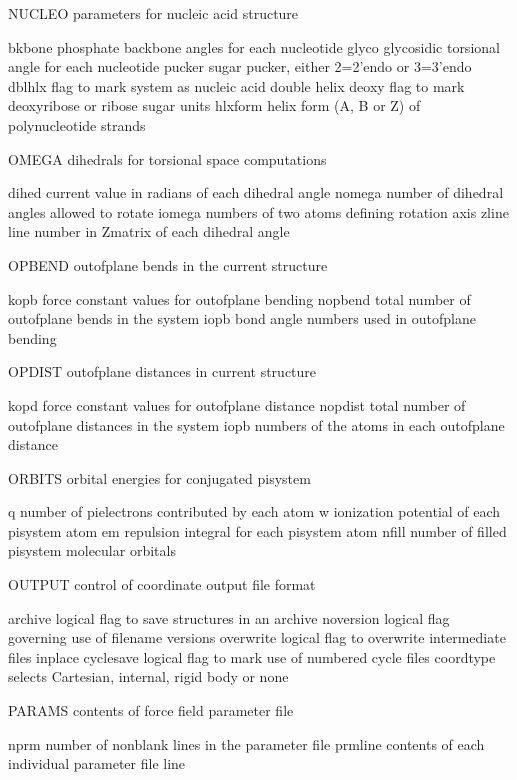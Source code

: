 \documentclass[letterpaper,11pt,english]{sphinxmanual}
\begin{document}
NUCLEO  parameters for nucleic acid structure

bkbone  phosphate backbone angles for each nucleotide
glyco   glycosidic torsional angle for each nucleotide
pucker  sugar pucker, either 2=2’\sphinxhyphen{}endo or 3=3’\sphinxhyphen{}endo
dblhlx  flag to mark system as nucleic acid double helix
deoxy   flag to mark deoxyribose or ribose sugar units
hlxform helix form (A, B or Z) of polynucleotide strands

OMEGA   dihedrals for torsional space computations

dihed   current value in radians of each dihedral angle
nomega  number of dihedral angles allowed to rotate
iomega  numbers of two atoms defining rotation axis
zline   line number in Z\sphinxhyphen{}matrix of each dihedral angle

OPBEND  out\sphinxhyphen{}of\sphinxhyphen{}plane bends in the current structure

kopb    force constant values for out\sphinxhyphen{}of\sphinxhyphen{}plane bending
nopbend total number of out\sphinxhyphen{}of\sphinxhyphen{}plane bends in the system
iopb    bond angle numbers used in out\sphinxhyphen{}of\sphinxhyphen{}plane bending

OPDIST  out\sphinxhyphen{}of\sphinxhyphen{}plane distances in current structure

kopd    force constant values for out\sphinxhyphen{}of\sphinxhyphen{}plane distance
nopdist total number of out\sphinxhyphen{}of\sphinxhyphen{}plane distances in the system
iopb    numbers of the atoms in each out\sphinxhyphen{}of\sphinxhyphen{}plane distance

ORBITS  orbital energies for conjugated pisystem

q       number of pi\sphinxhyphen{}electrons contributed by each atom
w       ionization potential of each pisystem atom
em      repulsion integral for each pisystem atom
nfill   number of filled pisystem molecular orbitals

OUTPUT  control of coordinate output file format

archive logical flag to save structures in an archive
noversion       logical flag governing use of filename versions
overwrite       logical flag to overwrite intermediate files inplace
cyclesave       logical flag to mark use of numbered cycle files
coordtype       selects Cartesian, internal, rigid body or none

PARAMS  contents of force field parameter file

nprm    number of nonblank lines in the parameter file
prmline contents of each individual parameter file line
\end{document}
